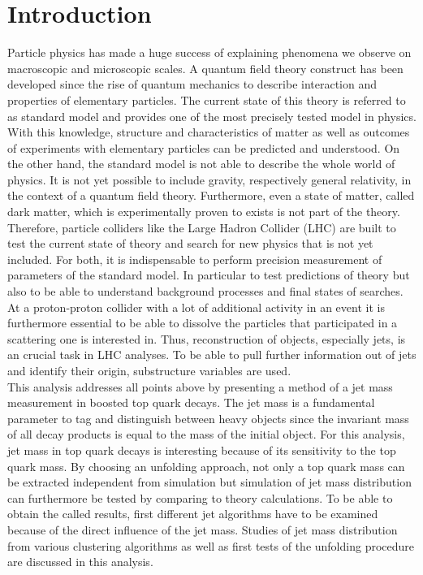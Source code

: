 \chapter{Introduction}

	Particle physics has made a huge success of explaining phenomena we observe on macroscopic and microscopic scales. A quantum field theory construct has been developed since the rise of quantum mechanics to describe interaction and properties of elementary particles. The current state of this theory is referred to as standard model and provides one of the most precisely tested model in physics. With this knowledge, structure and characteristics of matter as well as outcomes of experiments with elementary particles can be predicted and understood. On the other hand, the standard model is not able to describe the whole world of physics. It is not yet possible to include gravity, respectively general relativity, in the context of a quantum field theory. Furthermore, even a state of matter, called dark matter, which is experimentally proven to exists is not part of the theory. Therefore, particle colliders like the Large Hadron Collider (LHC) are built to test the current state of theory and search for new physics that is not yet included. For both, it is indispensable to perform precision measurement of parameters of the standard model. In particular to test predictions of theory but also to be able to understand background processes and final states of searches. At a proton-proton collider with a lot of additional activity in an event it is furthermore essential to be able to dissolve the particles that participated in a scattering one is interested in. Thus, reconstruction of objects, especially jets, is an crucial task in LHC analyses. To be able to pull further information out of jets and identify their origin, substructure variables are used. \\
	This analysis addresses all points above by presenting a method of a jet mass measurement in boosted top quark decays. The jet mass is a fundamental parameter to tag and distinguish between heavy objects since the invariant mass of all decay products is equal to the mass of the initial object. For this analysis, jet mass in top quark decays is interesting because of its sensitivity to the top quark mass. By choosing an unfolding approach, not only a top quark mass can be extracted independent from simulation but simulation of jet mass distribution can furthermore be tested by comparing to theory calculations. To be able to obtain the called results, first different jet algorithms have to be examined because of the direct influence of the jet mass. Studies of jet mass distribution from various clustering algorithms as well as first tests of the unfolding procedure are discussed in this analysis.
